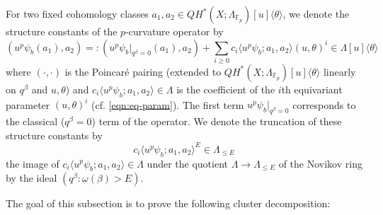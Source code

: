 \documentclass[reqno]{amsart}
\numberwithin{equation}{section}
\numberwithin{equation}{section}
\numberwithin{equation}{section}
\newtheorem{prop}[thm]{Proposition}
\theoremstyle{definition}
\theoremstyle{remark}
\theoremstyle{remark}
\begin{document}
For two fixed cohomology classes $a_1, a_2 \in QH^*(X;\Lambda_{\mathbb{F}_p})[u]\langle \theta \rangle$, we denote the structure constants of the $p$-curvature operator by
\begin{equation}
  \left( u^p \psi_b(a_1), a_2 \right) =:  \left( u^p \psi_b|_{q^\beta = 0} (a_1), a_2 \right) + \sum_{i \ge 0} c_i \langle  u^p  \psi_b; a_1, a_2 \rangle (u, \theta)^i \in \Lambda[u]\langle \theta \rangle
\end{equation}
where $(\cdot, \cdot)$ is the Poincar\'e pairing (extended to $QH^*(X;\Lambda_{\mathbb{F}_p})[u]\langle \theta \rangle$ linearly on $q^\beta$ and $u, \theta$) and $c_i \langle  u^p \psi_b; a_1, a_2 \rangle  \in \Lambda$ is the coefficient of the $i$th equivariant parameter $(u, \theta)^i$ (cf. \cref{eqn:eq-param}). The first term $u^p \psi_b|_{q^\beta = 0} $ corresponds to the classical ($q^\beta = 0$) term of the operator. We denote the truncation of these structure constants by
\begin{equation}
    c_i \langle  u^p \psi_b; a_1, a_2 \rangle^E  \in \Lambda_{\le E}
\end{equation}
the image of $c_i \langle u^p  \psi_b; a_1, a_2 \rangle  \in \Lambda$ under the quotient $\Lambda \to \Lambda_{\le E}$ of the Novikov ring by the ideal $(q^\beta : \omega(\beta) > E)$. 

The goal of this subsection is to prove the following cluster decomposition:

\end{document}
